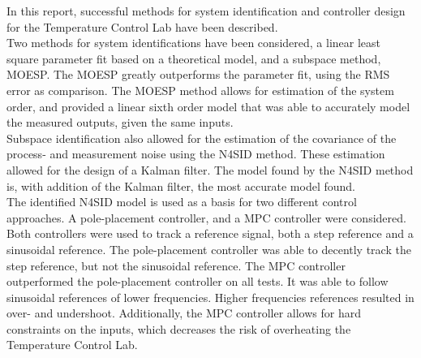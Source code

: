 In this report, successful methods for system identification and controller design for the Temperature Control Lab have been described.\\
Two methods for system identifications have been considered, a linear least square parameter fit based on a theoretical model, and a subspace method, MOESP. The MOESP greatly outperforms the parameter fit, using the RMS error as comparison. The MOESP method allows for estimation of the system order, and provided a linear sixth order model that was able to accurately model the measured outputs, given the same inputs.\\
Subspace identification also allowed for the estimation of the covariance of the process- and measurement noise using the N4SID method. These estimation allowed for the design of a Kalman filter. The model found by the N4SID method is, with addition of the Kalman filter, the most accurate model found.\\
The identified N4SID model is used as a basis for two different control approaches. A pole-placement controller, and a MPC controller were considered. Both controllers were used to track a reference signal, both a step reference and a sinusoidal reference. The pole-placement controller was able to decently track the step reference, but not the sinusoidal reference. The MPC controller outperformed the pole-placement controller on all tests. It was able to follow sinusoidal references of lower frequencies. Higher frequencies references resulted in over- and undershoot. Additionally, the MPC controller allows for hard constraints on the inputs, which decreases the risk of overheating the Temperature Control Lab.